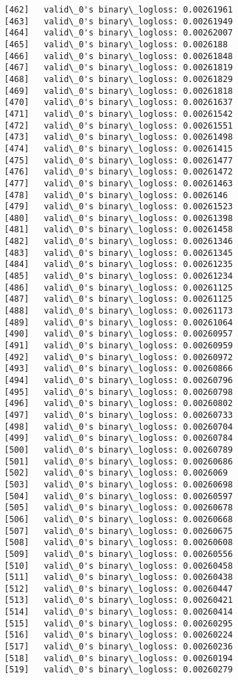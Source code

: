 \documentclass[11pt]{article}
\begin{document}
\begin{Verbatim}[commandchars=\\\{\}]
[462]	valid\_0's binary\_logloss: 0.00261961
[463]	valid\_0's binary\_logloss: 0.00261949
[464]	valid\_0's binary\_logloss: 0.00262007
[465]	valid\_0's binary\_logloss: 0.0026188
[466]	valid\_0's binary\_logloss: 0.00261848
[467]	valid\_0's binary\_logloss: 0.00261819
[468]	valid\_0's binary\_logloss: 0.00261829
[469]	valid\_0's binary\_logloss: 0.00261818
[470]	valid\_0's binary\_logloss: 0.00261637
[471]	valid\_0's binary\_logloss: 0.00261542
[472]	valid\_0's binary\_logloss: 0.00261551
[473]	valid\_0's binary\_logloss: 0.00261498
[474]	valid\_0's binary\_logloss: 0.00261415
[475]	valid\_0's binary\_logloss: 0.00261477
[476]	valid\_0's binary\_logloss: 0.00261472
[477]	valid\_0's binary\_logloss: 0.00261463
[478]	valid\_0's binary\_logloss: 0.0026146
[479]	valid\_0's binary\_logloss: 0.00261523
[480]	valid\_0's binary\_logloss: 0.00261398
[481]	valid\_0's binary\_logloss: 0.00261458
[482]	valid\_0's binary\_logloss: 0.00261346
[483]	valid\_0's binary\_logloss: 0.00261345
[484]	valid\_0's binary\_logloss: 0.00261235
[485]	valid\_0's binary\_logloss: 0.00261234
[486]	valid\_0's binary\_logloss: 0.00261125
[487]	valid\_0's binary\_logloss: 0.00261125
[488]	valid\_0's binary\_logloss: 0.00261173
[489]	valid\_0's binary\_logloss: 0.00261064
[490]	valid\_0's binary\_logloss: 0.00260957
[491]	valid\_0's binary\_logloss: 0.00260959
[492]	valid\_0's binary\_logloss: 0.00260972
[493]	valid\_0's binary\_logloss: 0.00260866
[494]	valid\_0's binary\_logloss: 0.00260796
[495]	valid\_0's binary\_logloss: 0.00260798
[496]	valid\_0's binary\_logloss: 0.00260802
[497]	valid\_0's binary\_logloss: 0.00260733
[498]	valid\_0's binary\_logloss: 0.00260704
[499]	valid\_0's binary\_logloss: 0.00260784
[500]	valid\_0's binary\_logloss: 0.00260789
[501]	valid\_0's binary\_logloss: 0.00260686
[502]	valid\_0's binary\_logloss: 0.0026069
[503]	valid\_0's binary\_logloss: 0.00260698
[504]	valid\_0's binary\_logloss: 0.00260597
[505]	valid\_0's binary\_logloss: 0.00260678
[506]	valid\_0's binary\_logloss: 0.00260668
[507]	valid\_0's binary\_logloss: 0.00260675
[508]	valid\_0's binary\_logloss: 0.00260608
[509]	valid\_0's binary\_logloss: 0.00260556
[510]	valid\_0's binary\_logloss: 0.00260458
[511]	valid\_0's binary\_logloss: 0.00260438
[512]	valid\_0's binary\_logloss: 0.00260447
[513]	valid\_0's binary\_logloss: 0.00260421
[514]	valid\_0's binary\_logloss: 0.00260414
[515]	valid\_0's binary\_logloss: 0.00260295
[516]	valid\_0's binary\_logloss: 0.00260224
[517]	valid\_0's binary\_logloss: 0.00260236
[518]	valid\_0's binary\_logloss: 0.00260194
[519]	valid\_0's binary\_logloss: 0.00260279

\end{Verbatim}
\end{document}
